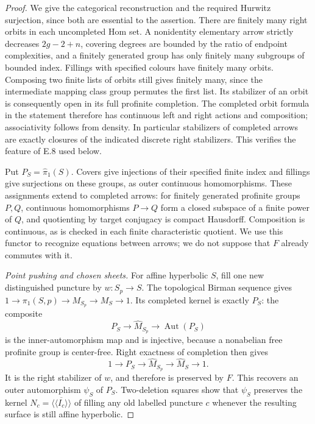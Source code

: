 \begin{proof}
We give the categorical reconstruction and the required
Hurwitz surjection, since both are essential to the assertion.
There are finitely many right orbits in each uncompleted Hom
set.  A nonidentity elementary arrow strictly decreases
$2g-2+n$, covering degrees are bounded by the ratio of endpoint
complexities, and a finitely generated group has only finitely
many subgroups of bounded index.  Fillings with specified
colours have finitely many orbits.  Composing two finite lists
of orbits still gives finitely many, since the intermediate
mapping class group permutes the first list.  Its stabilizer of
an orbit is consequently open in its full profinite completion.
The completed orbit formula in the statement therefore has
continuous left and right actions and composition; associativity
follows from density.  In particular stabilizers of completed
arrows are exactly closures of the indicated discrete right
stabilizers.  This verifies the feature of E.8 used below.

Put $P_S=\widehat\pi_1(S)$.  Covers give injections of their
specified finite index and fillings give surjections on these
groups, as outer continuous homomorphisms.  These assignments
extend to completed arrows: for finitely generated profinite
groups $P,Q$, continuous homomorphisms $P\to Q$ form a closed
subspace of a finite power of $Q$, and quotienting by target
conjugacy is compact Hausdorff.  Composition is continuous,
as is checked in each finite characteristic quotient.
We use this functor to recognize equations between arrows;
we do not suppose that $F$ already commutes with it.

\emph{Point pushing and chosen sheets.}
For affine hyperbolic $S$, fill one new distinguished puncture
by $w:S_p\to S$.  The topological Birman sequence gives
$1\to\pi_1(S,p)\to M_{S_p}\to M_S\to1$.
Its completed kernel is exactly $P_S$: the composite
\[
 P_S\longrightarrow\widehat M_{S_p}
             \longrightarrow\operatorname{Aut}(P_S)
\]
is the inner-automorphism map and is injective, because a
nonabelian free profinite group is center-free.  Right
exactness of completion then gives
\[
 1\longrightarrow P_S\longrightarrow\widehat M_{S_p}
                \longrightarrow\widehat M_S\longrightarrow1. \tag{E.20}
\]
It is the right stabilizer of $w$, and therefore is preserved
by $F$.  This recovers an outer automorphism $\psi_S$ of $P_S$.
Two-deletion squares show that $\psi_S$ preserves the kernel
$N_c=\overline{\langle\!\langle I_c\rangle\!\rangle}$ of
filling any old labelled puncture $c$ whenever the resulting
surface is still affine hyperbolic.


\end{proof}
